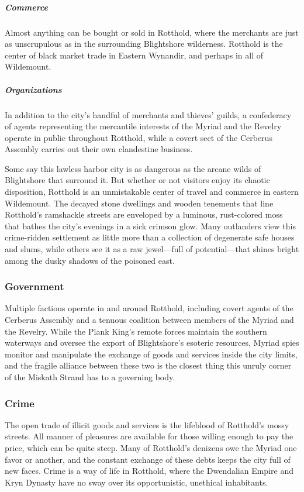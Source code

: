 \documentclass[10pt,a4paper,twoside,bg=print,twocolumn,openany,nodeprecatedcode]{dndbook}
\begin{document}
\subparagraph{Commerce}
Almost anything can be bought or sold in Rotthold, where the merchants are just as unscrupulous as in the surrounding Blightshore wilderness. Rotthold is the center of black market trade in Eastern Wynandir, and perhaps in all of Wildemount.

\subparagraph{Organizations}
In addition to the city's handful of merchants and thieves' guilds, a confederacy of agents representing the mercantile interests of the Myriad and the Revelry operate in public throughout Rotthold, while a covert sect of the Cerberus Assembly carries out their own clandestine business.

Some say this lawless harbor city is as dangerous as the arcane wilds of Blightshore that surround it. But whether or not visitors enjoy its chaotic disposition, Rotthold is an unmistakable center of travel and commerce in eastern Wildemount. The decayed stone dwellings and wooden tenements that line Rotthold's ramshackle streets are enveloped by a luminous, rust-colored moss that bathes the city's evenings in a sick crimson glow. Many outlanders view this crime-ridden settlement as little more than a collection of degenerate safe houses and slums, while others see it as a raw jewel—full of potential—that shines bright among the dusky shadows of the poisoned east.

\subsubsection{Government}
Multiple factions operate in and around Rotthold, including covert agents of the Cerberus Assembly and a tenuous coalition between members of the Myriad and the Revelry. While the Plank King's remote forces maintain the southern waterways and oversee the export of Blightshore's esoteric resources, Myriad spies monitor and manipulate the exchange of goods and services inside the city limits, and the fragile alliance between these two is the closest thing this unruly corner of the Miskath Strand has to a governing body.

\subsubsection{Crime}
The open trade of illicit goods and services is the lifeblood of Rotthold's mossy streets. All manner of pleasures are available for those willing enough to pay the price, which can be quite steep. Many of Rotthold's denizens owe the Myriad one favor or another, and the constant exchange of these debts keeps the city full of new faces. Crime is a way of life in Rotthold, where the Dwendalian Empire and Kryn Dynasty have no sway over its opportunistic, unethical inhabitants.
\end{document}
